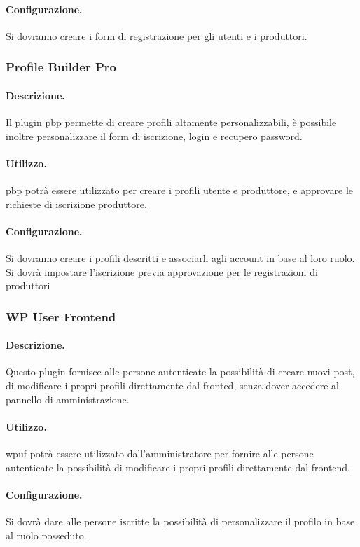 \paragraph{Configurazione.}  Si dovranno creare i form di registrazione per gli utenti e i produttori.

\subsubsection{Profile Builder Pro}
\paragraph{Descrizione.} Il plugin \gls{pbp} permette di creare profili altamente personalizzabili, è possibile inoltre personalizzare il form di iscrizione, login e recupero password. 
\paragraph{Utilizzo.}  \gls{pbp} potrà essere utilizzato per creare i profili utente e produttore, e approvare le richieste di iscrizione produttore.
\paragraph{Configurazione.}  Si dovranno creare i profili descritti e associarli agli account in base al loro ruolo. Si dovrà impostare l'iscrizione previa approvazione per le registrazioni di produttori

\subsubsection{WP User Frontend}
\paragraph{Descrizione.} Questo plugin fornisce alle persone autenticate la possibilità di creare nuovi post, di modificare i propri profili direttamente dal fronted, senza dover accedere al pannello di amministrazione.
\paragraph{Utilizzo.}  \gls{wpuf} potrà essere utilizzato dall'amministratore per fornire alle persone autenticate la possibilità di modificare i propri profili direttamente dal frontend.
\paragraph{Configurazione.} Si dovrà dare alle persone iscritte la possibilità di personalizzare il profilo in base al ruolo posseduto.

